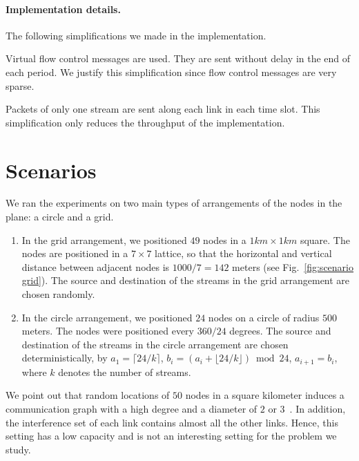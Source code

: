 \documentclass[12pt,oneside,english,a4paper]{book}
\theoremstyle{plain}
\theoremstyle{definition}
\theoremstyle{Theorem}
\theoremstyle{plain}
\newenvironment{proof sketch}[1]{\noindent {\emph{Proof sketch of #1:}}}{\hfill \qed}
\begin{document}
\paragraph{Implementation details.}
The following simplifications we made in the implementation.
\begin{inparaenum}[(1)]
\item Virtual flow control messages are used. They are sent without
  delay in the end of each period. We justify this simplification
  since flow control messages are very sparse.
\item Packets of only one stream are sent along each link in each time slot.
This simplification only reduces the throughput of the implementation.
\end{inparaenum}

\section{Scenarios}
We ran the experiments on two main types of arrangements of the nodes
in the plane: a circle and a grid.

\begin{enumerate}
\item In the grid arrangement, we positioned $49$ nodes in a
  $1km\times 1km$ square. The nodes are positioned in a $7\times 7$
  lattice, so that the horizontal and vertical distance between
  adjacent nodes is $1000/7=142$ meters (see Fig.~\ref{fig:scenario
    grid}).    The source and destination of the streams
  in the grid arrangement are chosen randomly.

\item In the circle arrangement, we positioned $24$ nodes on a circle
  of radius $500$ meters.  The nodes were positioned every $360/24$
  degrees. %
  The source and
  destination of the streams in the circle arrangement are chosen
  deterministically, by $a_1=\lceil 24/k \rceil$, $b_i=(a_i + \lfloor
  24/k \rfloor) \bmod 24$, $a_{i+1}=b_i$, where $k$ denotes the number of streams.
\end{enumerate}

We point out that random locations of $50$ nodes in a square kilometer
induces a communication graph with a high degree and a diameter of
$2$ or $3$~\cite{marina2010topology}. In addition, the interference set of
each link contains almost all the other links. Hence, this setting has a
low capacity and is not an interesting setting for the problem we
study.
\end{document}
